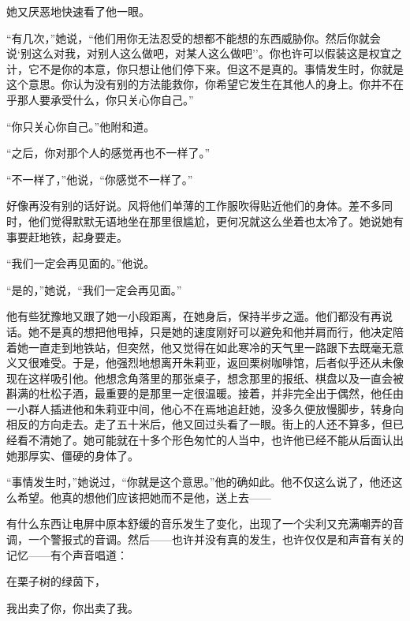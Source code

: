 她又厌恶地快速看了他一眼。

``有几次，''她说，``他们用你无法忍受的想都不能想的东西威胁你。然后你就会说`别这么对我，对别人这么做吧，对某人这么做吧''。你也许可以假装这是权宜之计，它不是你的本意，你只想让他们停下来。但这不是真的。事情发生时，你就是这个意思。你认为没有别的方法能救你，你希望它发生在其他人的身上。你并不在乎那人要承受什么，你只关心你自己。''

``你只关心你自己。''他附和道。

``之后，你对那个人的感觉再也不一样了。''

``不一样了，''他说，``你感觉不一样了。''

好像再没有别的话好说。风将他们单薄的工作服吹得贴近他们的身体。差不多同时，他们觉得默默无语地坐在那里很尴尬，更何况就这么坐着也太冷了。她说她有事要赶地铁，起身要走。

``我们一定会再见面的。''他说。

``是的，''她说，``我们一定会再见面。''

他有些犹豫地又跟了她一小段距离，在她身后，保持半步之遥。他们都没有再说话。她不是真的想把他甩掉，只是她的速度刚好可以避免和他并肩而行，他决定陪着她一直走到地铁站，但突然，他又觉得在如此寒冷的天气里一路跟下去既毫无意义又很难受。于是，他强烈地想离开朱莉亚，返回栗树咖啡馆，后者似乎还从未像现在这样吸引他。他想念角落里的那张桌子，想念那里的报纸、棋盘以及一直会被斟满的杜松子酒，最重要的是那里一定很温暖。接着，并非完全出于偶然，他任由一小群人插进他和朱莉亚中间，他心不在焉地追赶她，没多久便放慢脚步，转身向相反的方向走去。走了五十米后，他又回过头看了一眼。街上的人还不算多，但已经看不清她了。她可能就在十多个形色匆忙的人当中，也许他已经不能从后面认出她那厚实、僵硬的身体了。

``事情发生时，''她说过，``你就是这个意思。''他的确如此。他不仅这么说了，他还这么希望。他真的想他们应该把她而不是他，送上去------

有什么东西让电屏中原本舒缓的音乐发生了变化，出现了一个尖利又充满嘲弄的音调，一个警报式的音调。然后------也许并没有真的发生，也许仅仅是和声音有关的记忆------有个声音唱道：

在栗子树的绿茵下，

我出卖了你，你出卖了我。

